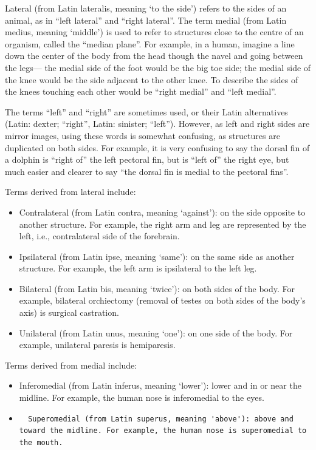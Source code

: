 \documentclass[]{book}
\providecommand{\tightlist}{%
  \setlength{\itemsep}{0pt}\setlength{\parskip}{0pt}}
\begin{document}
Lateral (from Latin lateralis, meaning `to the side') refers to the sides of an animal, as in ``left lateral'' and ``right lateral''. The term medial (from Latin medius, meaning `middle') is used to refer to structures close to the centre of an organism, called the ``median plane''. For example, in a human, imagine a line down the center of the body from the head though the navel and going between the legs--- the medial side of the foot would be the big toe side; the medial side of the knee would be the side adjacent to the other knee. To describe the sides of the knees touching each other would be ``right medial'' and ``left medial''.

The terms ``left'' and ``right'' are sometimes used, or their Latin alternatives (Latin: dexter; ``right'', Latin: sinister; ``left''). However, as left and right sides are mirror images, using these words is somewhat confusing, as structures are duplicated on both sides. For example, it is very confusing to say the dorsal fin of a dolphin is ``right of'' the left pectoral fin, but is ``left of'' the right eye, but much easier and clearer to say ``the dorsal fin is medial to the pectoral fins''.

Terms derived from lateral include:

\begin{itemize}
\tightlist
\item
  Contralateral (from Latin contra, meaning `against'): on the side opposite to another structure. For example, the right arm and leg are represented by the left, i.e., contralateral side of the forebrain.
\item
  Ipsilateral (from Latin ipse, meaning `same'): on the same side as another structure. For example, the left arm is ipsilateral to the left leg.
\item
  Bilateral (from Latin bis, meaning `twice'): on both sides of the body. For example, bilateral orchiectomy (removal of testes on both sides of the body's axis) is surgical castration.
\item
  Unilateral (from Latin unus, meaning `one'): on one side of the body. For example, unilateral paresis is hemiparesis.
\end{itemize}

Terms derived from medial include:

\begin{itemize}
\item
  Inferomedial (from Latin inferus, meaning `lower'): lower and in or near the midline. For example, the human nose is inferomedial to the eyes.
\item
\begin{verbatim}
  Superomedial (from Latin superus, meaning 'above'): above and toward the midline. For example, the human nose is superomedial to the mouth.
\end{verbatim}
\end{itemize}
\end{document}
